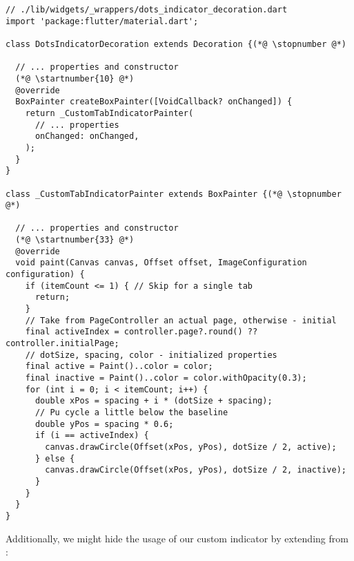 \begin{lstlisting}
// ./lib/widgets/_wrappers/dots_indicator_decoration.dart
import 'package:flutter/material.dart';

class DotsIndicatorDecoration extends Decoration {(*@ \stopnumber @*)

  // ... properties and constructor
  (*@ \startnumber{10} @*)
  @override
  BoxPainter createBoxPainter([VoidCallback? onChanged]) {
    return _CustomTabIndicatorPainter(
      // ... properties
      onChanged: onChanged,
    );
  }
}

class _CustomTabIndicatorPainter extends BoxPainter {(*@ \stopnumber @*)

  // ... properties and constructor
  (*@ \startnumber{33} @*)
  @override
  void paint(Canvas canvas, Offset offset, ImageConfiguration configuration) {
    if (itemCount <= 1) { // Skip for a single tab
      return;
    }
    // Take from PageController an actual page, otherwise - initial
    final activeIndex = controller.page?.round() ?? controller.initialPage;
    // dotSize, spacing, color - initialized properties
    final active = Paint()..color = color;
    final inactive = Paint()..color = color.withOpacity(0.3);
    for (int i = 0; i < itemCount; i++) {
      double xPos = spacing + i * (dotSize + spacing);
      // Pu cycle a little below the baseline
      double yPos = spacing * 0.6; 
      if (i == activeIndex) {
        canvas.drawCircle(Offset(xPos, yPos), dotSize / 2, active);
      } else {
        canvas.drawCircle(Offset(xPos, yPos), dotSize / 2, inactive);
      }
    }
  }
}
\end{lstlisting}

\noindent Additionally, we might hide the usage of our custom indicator by extending from :

